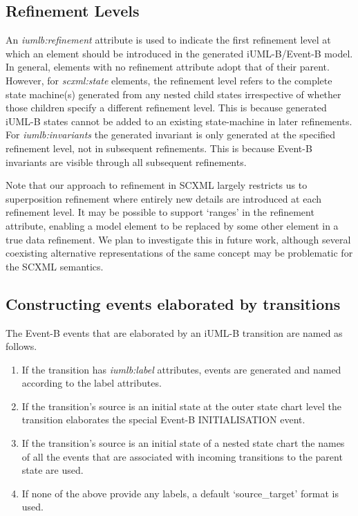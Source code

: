 \subsection{Refinement Levels}
An \emph{iumlb:refinement} attribute is used to indicate the first refinement 
level at which an element should be introduced in the generated iUML-B/Event-B model. 
In general, elements with no refinement attribute adopt that of their parent.  
However, for \emph{scxml:state} elements, the refinement level refers to the complete state 
machine(s) generated from any nested child states irrespective of whether 
those children specify a different refinement level. This is because generated 
iUML-B states cannot be added to an existing state-machine in later refinements.
For \emph{iumlb:invariants} the generated invariant is only  generated at the 
specified refinement level, not in  subsequent refinements. This is because Event-B 
invariants are visible through all subsequent refinements.

Note that our approach to refinement in SCXML largely restricts us to superposition 
refinement where entirely new details are introduced at each refinement level.  
It may be possible to support `ranges' in the refinement attribute, enabling a model 
element to be replaced by some other element in a true data refinement. We plan to 
investigate this in future work, although several coexisting alternative 
representations of the same concept may be problematic for the SCXML semantics.

\subsection{Constructing events elaborated by transitions}
The Event-B events that are elaborated by an iUML-B  transition are named as follows. 

\vspace{-\topsep}
\begin{enumerate}
  \setlength{\parskip}{0pt}
  \setlength{\itemsep}{0pt plus 1pt}
\item If the transition has \emph{iumlb:label} attributes, events are generated 
and named according to the label attributes.
\item If the transition's source is an initial state at the outer state chart 
level the transition elaborates the special Event-B INITIALISATION event. 
\item If the transition's source is an initial state of a nested state chart 
the names of all the events that are associated with incoming transitions to 
the parent state are used.
\item If none of the above provide any labels, a default  `source\_target' format is used.
\end{enumerate}
\vspace{-\topsep}

